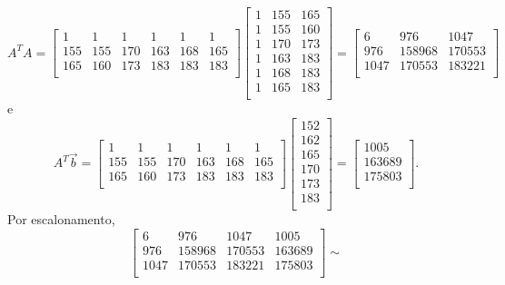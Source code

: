 \documentclass[../livro.tex]{subfiles}  %
\begin{document}
\begin{example}
\[  A^TA =
  \begin{bmatrix}
    1 & 1 & 1 & 1 & 1 & 1 \\
    155 & 155 & 170 & 163 & 168 & 165 \\
    165 & 160 & 173 & 183 & 183 & 183 \\
  \end{bmatrix}
  \begin{bmatrix}
    1 & 155 & 165 \\
    1 & 155 & 160 \\
    1 & 170 & 173 \\
    1 & 163 & 183 \\
    1 & 168 & 183 \\
    1 & 165 & 183 \\
  \end{bmatrix} =
  \begin{bmatrix}
    6 & 976 & 1047 \\
    976 & 158968 & 170553 \\
    1047 & 170553 & 183221 \\
  \end{bmatrix}
  \] e
  \[
  A^T \vec{b} =
  \begin{bmatrix}
    1 & 1 & 1 & 1 & 1 & 1 \\
    155 & 155 & 170 & 163 & 168 & 165 \\
    165 & 160 & 173 & 183 & 183 & 183 \\
  \end{bmatrix}
  \begin{bmatrix}
    152  \\
    162  \\
    165  \\
    170  \\
    173  \\
    183  \\
  \end{bmatrix} =
  \begin{bmatrix}
    1005  \\
    163689  \\
    175803 \\
  \end{bmatrix}.
  \] Por escalonamento,
  \[
  \begin{bmatrix}
    6    & 976    & 1047   & 1005     \\
    976  & 158968 & 170553 & 163689   \\
    1047 & 170553 & 183221 & 175803   \\
  \end{bmatrix} \sim
\]
\end{example}
\end{document}
